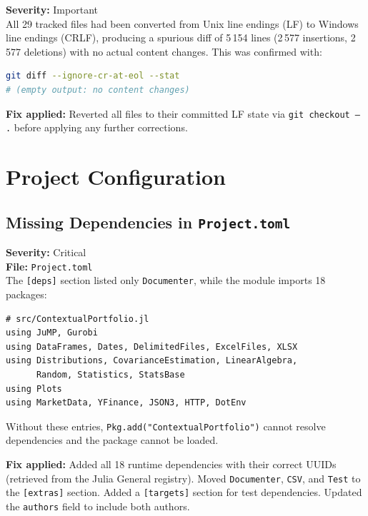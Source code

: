 \documentclass[11pt,a4paper]{article}
\begin{document}
\textbf{Severity:} Important\\[0.3em]
All 29 tracked files had been converted from Unix line endings (LF) to Windows
line endings (CRLF), producing a spurious diff of 5\,154 lines (2\,577 insertions,
2\,577 deletions) with no actual content changes. This was confirmed with:

\begin{lstlisting}[language=bash, numbers=none]
git diff --ignore-cr-at-eol --stat
# (empty output: no content changes)
\end{lstlisting}

\textbf{Fix applied:} Reverted all files to their committed LF state via
\texttt{git checkout -- .} before applying any further corrections.

\section{Project Configuration}

\subsection{Missing Dependencies in \texttt{Project.toml}}
\label{sec:project-toml}

\textbf{Severity:} Critical\\
\textbf{File:} \texttt{Project.toml}\\[0.3em]
The \texttt{[deps]} section listed only \texttt{Documenter}, while the module
imports 18 packages:

\begin{lstlisting}
# src/ContextualPortfolio.jl
using JuMP, Gurobi
using DataFrames, Dates, DelimitedFiles, ExcelFiles, XLSX
using Distributions, CovarianceEstimation, LinearAlgebra,
      Random, Statistics, StatsBase
using Plots
using MarketData, YFinance, JSON3, HTTP, DotEnv
\end{lstlisting}

Without these entries, \texttt{Pkg.add("ContextualPortfolio")} cannot resolve
dependencies and the package cannot be loaded.

\textbf{Fix applied:} Added all 18 runtime dependencies with their correct UUIDs
(retrieved from the Julia General registry). Moved \texttt{Documenter},
\texttt{CSV}, and \texttt{Test} to the \texttt{[extras]} section. Added a
\texttt{[targets]} section for test dependencies. Updated the \texttt{authors}
field to include both authors.
\end{document}
